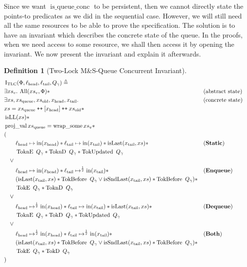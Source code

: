 \documentclass[a4paper, 10pt]{report}
\theoremstyle{definition}
\newtheorem{definition}{Definition}[section]
\newcommand{\msq}{M\&S-Queue\xspace}
\newcommand{\tlmsq}{Two-Lock \msq}
\newcommand{\isqueueconc}{\operatorname{is\_queue\_conc}}
\newcommand{\TLQueueInvariantConc}{\operatorname{I_{TLC}}}
\newcommand{\xsc}{xs}
\newcommand{\xsqueue}{xs_{\mathrm{queue}}}
\newcommand{\xsold}{xs_{\mathrm{old}}}
\newcommand{\isLL}{\operatorname{isLL}}
\newcommand{\AllP}{\operatorname{All}}
\newcommand{\projval}{\operatorname{proj\_val}}
\newcommand{\wrapsome}{\operatorname{wrap\_some}}
\newcommand{\isLast}{\operatorname{isLast}}
\newcommand{\isSndLast}{\operatorname{isSndLast}}
\newcommand{\locN}[1]{\loc_{\mathrm{#1}}}
\newcommand{\lochead}{\locN{head}}
\newcommand{\loctail}{\locN{tail}}
\newcommand{\nIn}[1]{\operatorname{in}(#1)}
\newcommand{\node}{x}
\newcommand{\nodeN}[1]{\node_{\mathrm{#1}}}
\newcommand{\nodehead}{\nodeN{head}}
\newcommand{\nodetail}{\nodeN{tail}}
\newcommand{\absvalueList}{xs_v}
\newcommand{\StaticState}{\textbf{Static}}
\newcommand{\EnqueueState}{\textbf{Enqueue}}
\newcommand{\DequeueState}{\textbf{Dequeue}}
\newcommand{\BothState}{\textbf{Both}}
\newcommand{\Qg}{Q_\gname}
\newcommand{\TokE}[1]{\operatorname{TokE} ~ #1}
\newcommand{\TokEQg}{\TokE{\Qg}}
\newcommand{\ToknE}[1]{\operatorname{ToknE} ~ #1}
\newcommand{\ToknEQg}{\ToknE{\Qg}}
\newcommand{\TokD}[1]{\operatorname{TokD} ~ #1}
\newcommand{\TokDQg}{\TokD{\Qg}}
\newcommand{\ToknD}[1]{\operatorname{ToknD} ~ #1}
\newcommand{\ToknDQg}{\ToknD{\Qg}}
\newcommand{\TokBefore}[1]{\operatorname{TokBefore} ~ #1}
\newcommand{\TokBeforeQg}{\TokBefore{\Qg}}
\newcommand{\TokAfterQg}{\TokBefore{\Qg}}
\newcommand{\TokUpdated}[1]{\operatorname{TokUpdated} ~ #1}
\newcommand{\TokUpdatedQg}{\TokUpdated{\Qg}}
\newcommand\catenate{\mathbin{\text{\ttfamily\upshape ++}}}
\begin{document}
Since we want $\isqueueconc$ to be persistent, then we cannot directly state the points-to predicates as we did in the sequential case. However, we will still need all the same resources to be able to prove the specification. The solution is to have an invariant which describes the concrete state of the queue. In the proofs, when we need access to some resource, we shall then access it by opening the invariant. We now present the invariant and explain it afterwards.
\begin{definition}[\tlmsq Concurrent Invariant]\label{TLMSQ:spec:conc:invariant}
  \begin{align*}
    &\TLQueueInvariantConc(\Phi, \lochead, \loctail, \Qg) \eqdef\\
    &\Exists \absvalueList. \AllP(\absvalueList, \Phi) \star &&\text{(abstract state)}\\
    &\Exists \xsc, \xsqueue, \xsold, \nodehead, \nodetail . &&\text{(concrete state)}\\
    &\xsc = \xsqueue \catenate [\nodehead] \catenate \xsold \star\\
    &\isLL(\xsc) \star\\
    &\projval \xsqueue = \wrapsome \absvalueList \star\\
    &(\\
    &\quad\quad\lochead \mapsto \nIn{\nodehead} \star \loctail \mapsto \nIn{\nodetail} \star \isLast(\nodetail, \xsc) \star &&\text{(\StaticState)}\\
    &\quad\quad \ToknEQg \star \ToknDQg \star \TokUpdatedQg\\
    &\quad\lor\\
    &\quad\quad\lochead \mapsto \nIn{\nodehead} \star \loctail \mapsto^{\frac{1}{2}} \nIn{\nodetail} \star &&\text{(\EnqueueState)}\\
    &\quad\quad (\isLast(\nodetail, \xsc) \star \TokBeforeQg \lor \isSndLast(\nodetail, \xsc) \star \TokAfterQg) \star\\
    &\quad\quad \TokEQg \star \ToknDQg\\
    &\quad\lor\\
    &\quad\quad\lochead \mapsto^{\frac{1}{2}} \nIn{\nodehead} \star \loctail \mapsto \nIn{\nodetail} \star \isLast(\nodetail, \xsc) \star &&\text{(\DequeueState)}\\
    &\quad\quad \ToknEQg \star \TokDQg \star \TokUpdatedQg\\
    &\quad\lor\\
    &\quad\quad\lochead \mapsto^{\frac{1}{2}} \nIn{\nodehead} \star \loctail \mapsto^{\frac{1}{2}} \nIn{\nodetail} \star &&\text{(\BothState)}\\
    &\quad\quad (\isLast(\nodetail, \xsc) \star \TokBeforeQg \lor \isSndLast(\nodetail, \xsc) \star \TokAfterQg) \star \\
    &\quad\quad \TokEQg \star \TokDQg\\
    &)
  \end{align*}
\end{definition}
\end{document}

